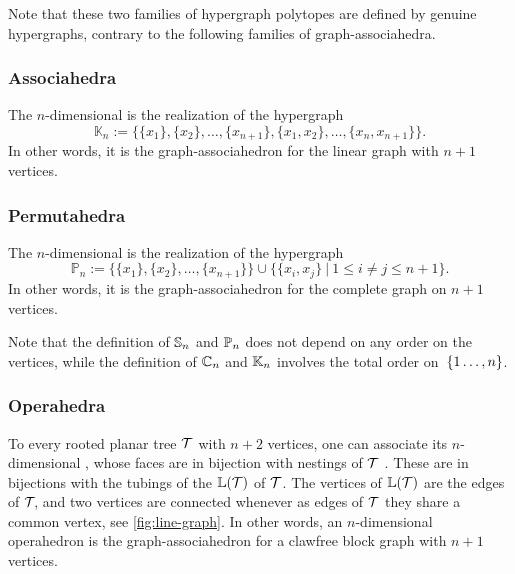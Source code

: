 \begin{rem}
  Note that these two families of hypergraph polytopes are defined by genuine hypergraphs, contrary to the following families of graph-associahedra.
\end{rem}

\subsubsection{Associahedra}
The $n$-dimensional  is the realization of the hypergraph 
$$\mathbb{K}_n:=\{\{x_1\},\{x_2\},\ldots,\{x_{n+1}\},\{x_1,x_2\},\ldots,\{x_n,x_{n+1}\}\}.$$
In other words, it is the graph-associahedron for the linear graph with $n+1$ vertices.

\subsubsection{Permutahedra}
The $n$-dimensional  is the realization of the hypergraph 
$$\mathbb{P}_n:=\{\{x_1\},\{x_2\},\ldots,\{x_{n+1}\}\} \cup \{\{x_i,x_j\} \ | \ 1 \leq i \neq j \leq n+1 \}.$$
In other words, it is the graph-associahedron for the complete graph on $n+1$ vertices.

\begin{rem}
  Note that the definition of ${\mathbb S}_n$ and ${\mathbb P}_n$ does not depend on any order on the vertices, while the definition of ${\mathbb C}_n$ and ${\mathbb K}_n$ involves the total order on~$\left\{1\ldots,n\right\}$. 
\end{rem}

\subsubsection{Operahedra}
To every rooted planar tree $\mathcal{T}$ with $n+2$ vertices, one can associate its $n$-dimensional , whose faces are in bijection with nestings of $\mathcal{T}$ \cite{laplante-anfossiDiagonalOperahedra2022a,CLA1}.
These are in bijections with the tubings of the  $\mathbb{L}(\mathcal{T})$ of $\mathcal{T}$.
The vertices of $\mathbb{L}(\mathcal{T})$ are the edges of ${\cal T}\!$, and two vertices are connected whenever as edges of ${\cal T}$ they share a common vertex, see \cref{fig:line-graph}.
In other words, an $n$-dimensional operahedron is the graph-associahedron for a clawfree block graph with $n+1$ vertices.

